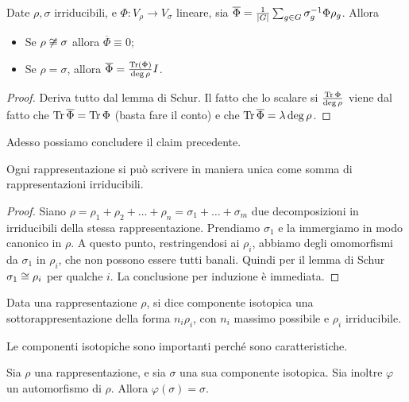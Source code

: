 \documentclass[a4paper,10pt,oneside]{math_article}
\renewcommand{\phi}{\varphi}
\newcommand{\id}{I}
\renewcommand{\bar}{\overline}
\begin{document}
    \begin{mycor}
     Date $\rho,\sigma$ irriducibili, e $\Phi: V_\rho \rightarrow V_\sigma$ lineare, sia $\bar \Phi = \frac 1{\abs G} \sum_{g\in G} \sigma_g\inv \Phi \rho_g$. Allora
     \begin{itemize}
      \item Se $\rho \not \cong \sigma$ allora $\bar \Phi\equiv 0$;
      \item Se $\rho = \sigma$, allora $\bar \Phi = \frac{\Tr(\Phi)}{\deg \rho}\id$.
     \end{itemize}
    \end{mycor}
    \begin{proof}
     Deriva tutto dal lemma di Schur. Il fatto che lo scalare si $\frac{\operatorname{Tr} \Phi}{\deg \rho}$ viene dal fatto che $\Tr \bar \Phi = \Tr \Phi$ (basta fare il conto) e che $\Tr \bar \Phi = \lambda \deg \rho$.
    \end{proof}


    Adesso possiamo concludere il claim precedente.
    \begin{myprop}
     Ogni rappresentazione si può scrivere in maniera unica come somma di rappresentazioni irriducibili.
    \end{myprop}
    \begin{proof}
     Siano $\rho = \rho_1 + \rho_2 + \dots + \rho_n = \sigma_1 + \dots +\sigma_m$ due decomposizioni in irriducibili della stessa rappresentazione. Prendiamo $\sigma_1$ e la immergiamo in modo canonico in $\rho$. A questo punto, restringendosi ai $\rho_i$, abbiamo degli omomorfismi da $\sigma_1$ in $\rho_i$, che non possono essere tutti banali. Quindi per il lemma di Schur $\sigma_1\cong \rho_i$ per qualche $i$. La conclusione per induzione è immediata. 
    \end{proof}
    
    \begin{mydef}
     Data una rappresentazione $\rho$, si dice componente isotopica una sottorappresentazione della forma $n_i\rho_i$, con $n_i$ massimo possibile e $\rho_i$ irriducibile.
    \end{mydef}

    Le componenti isotopiche sono importanti perché sono caratteristiche.
    
    \begin{myprop}
     Sia $\rho$ una rappresentazione, e sia $\sigma$ una sua componente isotopica. Sia inoltre $\phi$ un automorfismo di $\rho$. Allora $\phi(\sigma)=\sigma$.
    \end{myprop}
\end{document}
